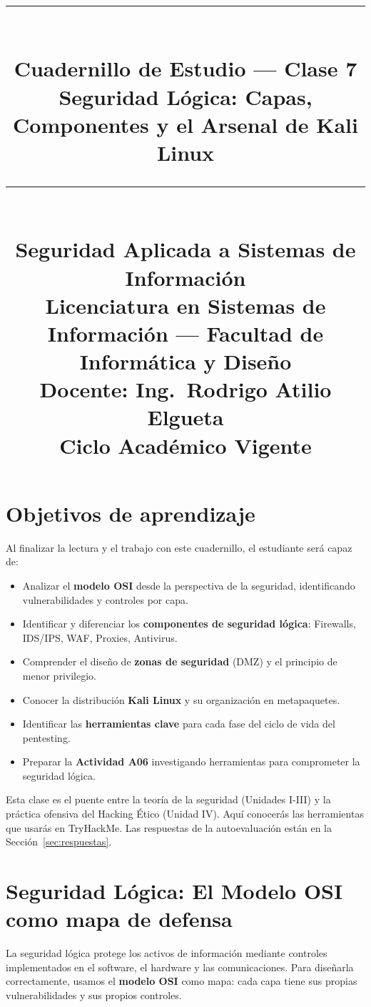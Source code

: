 \documentclass[11pt,a4paper]{article}
\title{%
  \rule{\textwidth}{1pt}\\[0.4cm]
  \textbf{\Large Cuadernillo de Estudio --- Clase 7}\\[0.2cm]
  \large Seguridad Lógica: Capas, Componentes y el Arsenal de Kali Linux\\[0.2cm]
  \rule{\textwidth}{1pt}\\[0.4cm]
  \normalsize Seguridad Aplicada a Sistemas de Información\\
  Licenciatura en Sistemas de Información --- Facultad de Informática y Diseño\\
  Docente: Ing.\ Rodrigo Atilio Elgueta\\[0.2cm]
  \small Ciclo Académico Vigente
}
\author{}
\date{}
\begin{document}
\maketitle
\thispagestyle{fancy}
\tableofcontents
\newpage

\section{Objetivos de aprendizaje}
Al finalizar la lectura y el trabajo con este cuadernillo, el estudiante será capaz de:

\begin{itemize}[leftmargin=*]
  \item Analizar el \textbf{modelo OSI} desde la perspectiva de la seguridad, identificando vulnerabilidades y controles por capa.
  \item Identificar y diferenciar los \textbf{componentes de seguridad lógica}: Firewalls, IDS/IPS, WAF, Proxies, Antivirus.
  \item Comprender el diseño de \textbf{zonas de seguridad} (DMZ) y el principio de menor privilegio.
  \item Conocer la distribución \textbf{Kali Linux} y su organización en metapaquetes.
  \item Identificar las \textbf{herramientas clave} para cada fase del ciclo de vida del pentesting.
  \item Preparar la \textbf{Actividad A06} investigando herramientas para comprometer la seguridad lógica.
\end{itemize}

\begin{clave}
Esta clase es el puente entre la teoría de la seguridad (Unidades I-III) y la práctica ofensiva del Hacking Ético (Unidad IV). Aquí conocerás las herramientas que usarás en TryHackMe. Las respuestas de la autoevaluación están en la Sección~\ref{sec:respuestas}.
\end{clave}

\section{Seguridad Lógica: El Modelo OSI como mapa de defensa}
La seguridad lógica protege los activos de información mediante controles implementados en el software, el hardware y las comunicaciones. Para diseñarla correctamente, usamos el \textbf{modelo OSI} como mapa: cada capa tiene sus propias vulnerabilidades y sus propios controles.
\end{document}
